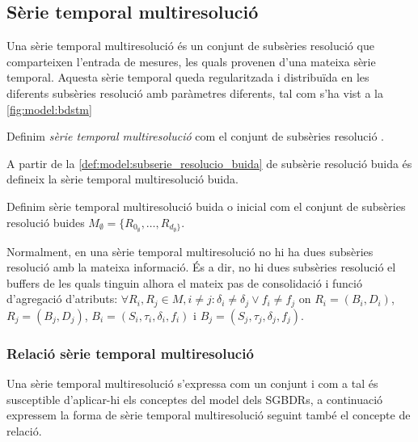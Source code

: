 \subsection{Sèrie temporal multiresolució}


Una sèrie temporal multiresolució és un conjunt de subsèries resolució
que comparteixen l'entrada de mesures, les quals provenen d'una
mateixa sèrie temporal. Aquesta sèrie temporal queda regularitzada i
distribuïda en les diferents subsèries resolució amb paràmetres
diferents, tal com s'ha vist a la \autoref{fig:model:bdstm}


\begin{definition}
  \label{def:sgstm:stm}
  Definim \emph{sèrie temporal multiresolució} com el conjunt de subsèries
  resolució .
\end{definition}

A partir de la \autoref{def:model:subserie_resolucio_buida} de
subsèrie resolució buida és defineix la sèrie temporal multiresolució
buida.
 
\begin{definition}\label{def:model:st_multiresolucio_buit}
  Definim sèrie temporal multiresolució buida o inicial com el conjunt
  de subsèries resolució buides
  $M_{\emptyset}=\{R_{0_{\emptyset}},\dotsc,R_{d_{\emptyset}\}}$.
\end{definition}


Normalment, en una sèrie temporal multiresolució no hi ha dues
subsèries resolució amb la mateixa informació. És a dir, no hi dues
subsèries resolució el buffers de les quals tinguin alhora el mateix
pas de consolidació i funció d'agregació d'atributs: $\forall
R_i,R_j\in M, i\neq j : \delta_i \neq \delta_j \vee f_i \neq f_j$ on
$R_i = (B_i, D_i)$, $R_j = (B_j, D_j)$,
$B_i=(S_i,\tau_i,\delta_i,f_i)$ i $B_j=(S_j,\tau_j,\delta_j,f_j)$.



\subsubsection{Relació sèrie temporal multiresolució}

Una sèrie temporal multiresolució s'expressa com un conjunt i com a
tal és susceptible d'aplicar-hi els conceptes del model dels
\glspl{SGBDR}, a continuació expressem la forma de sèrie temporal
multiresolució seguint també el concepte de relació. 


